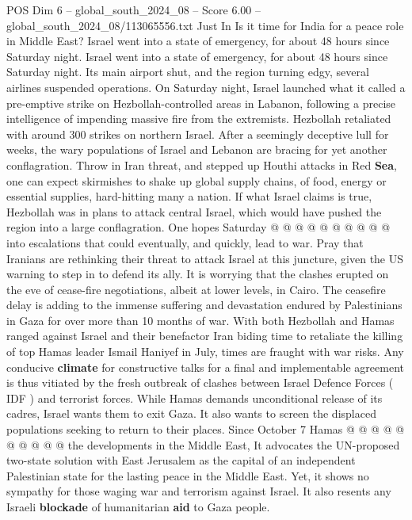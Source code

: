 \begin{textsample}{POS Dim 6 – global\_south\_2024\_08 – Score 6.00 – global\_south\_2024\_08/113065556.txt}  \label{ex:f6_pos_385}
Just In Is it time for India for a peace role in Middle East?
Israel went into a state of emergency, for about 48 hours since Saturday night.
Israel went into a state of emergency, for about 48 hours since Saturday night.
Its main airport shut, and the region turning edgy, several airlines suspended operations.
On Saturday night, Israel launched what it called a pre-emptive strike on Hezbollah-controlled areas in Labanon, following a precise intelligence of impending massive fire from the extremists.
Hezbollah retaliated with around 300 strikes on northern Israel.
After a seemingly deceptive lull for weeks, the wary populations of Israel and Lebanon are bracing for yet another conflagration.
Throw in Iran threat, and stepped up Houthi attacks in Red \textbf{Sea}, one can expect skirmishes to shake up global supply chains, of food, energy or essential supplies, hard-hitting many a nation.
If what Israel claims is true, Hezbollah was in plans to attack central Israel, which would have pushed the region into a large conflagration.
One hopes Saturday @ @ @ @ @ @ @ @ @ @ into escalations that could eventually, and quickly, lead to war.
Pray that Iranians are rethinking their threat to attack Israel at this juncture, given the US warning to step in to defend its ally.
It is worrying that the clashes erupted on the eve of cease-fire negotiations, albeit at lower levels, in Cairo.
The ceasefire delay is adding to the immense suffering and devastation endured by Palestinians in Gaza for over more than 10 months of war.
With both Hezbollah and Hamas ranged against Israel and their benefactor Iran biding time to retaliate the killing of top Hamas leader Ismail Haniyef in July, times are fraught with war risks.
Any conducive \textbf{climate} for constructive talks for a final and implementable agreement is thus vitiated by the fresh outbreak of clashes between Israel Defence Forces ( IDF ) and terrorist forces.
While Hamas demands unconditional release of its cadres, Israel wants them to exit Gaza.
It also wants to screen the displaced populations seeking to return to their places.
Since October 7 Hamas @ @ @ @ @ @ @ @ @ @ the developments in the Middle East, It advocates the UN-proposed two-state solution with East Jerusalem as the capital of an independent Palestinian state for the lasting peace in the Middle East.
Yet, it shows no sympathy for those waging war and terrorism against Israel.
It also resents any Israeli \textbf{blockade} of humanitarian \textbf{aid} to Gaza people.

\end{textsample}
